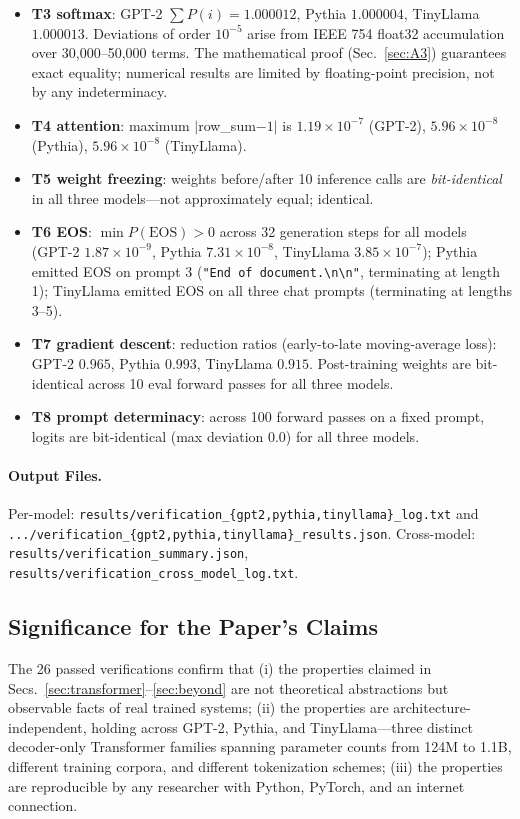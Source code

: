 \documentclass[a4paper,twocolumn,11pt]{article}
\begin{document}
\begin{itemize}[noitemsep]
\item \textbf{T3 softmax}: GPT-2 $\sum P(i) = 1.000012$, Pythia $1.000004$, TinyLlama $1.000013$. Deviations of order $10^{-5}$ arise from IEEE 754 float32 accumulation over 30{,}000--50{,}000 terms. The mathematical proof (Sec.~\ref{sec:A3}) guarantees exact equality; numerical results are limited by floating-point precision, not by any indeterminacy.
\item \textbf{T4 attention}: maximum $|$row\_sum$-1|$ is $1.19 \times 10^{-7}$ (GPT-2), $5.96 \times 10^{-8}$ (Pythia), $5.96 \times 10^{-8}$ (TinyLlama).
\item \textbf{T5 weight freezing}: weights before/after 10 inference calls are \emph{bit-identical} in all three models---not approximately equal; identical.
\item \textbf{T6 EOS}: $\min P(\mathrm{EOS}) > 0$ across 32 generation steps for all models (GPT-2 $1.87 \times 10^{-9}$, Pythia $7.31 \times 10^{-8}$, TinyLlama $3.85 \times 10^{-7}$); Pythia emitted EOS on prompt 3 (\texttt{"End of document.\textbackslash n\textbackslash n"}, terminating at length 1); TinyLlama emitted EOS on all three chat prompts (terminating at lengths 3--5).
\item \textbf{T7 gradient descent}: reduction ratios (early-to-late moving-average loss): GPT-2 $0.965$, Pythia $0.993$, TinyLlama $0.915$. Post-training weights are bit-identical across 10 eval forward passes for all three models.
\item \textbf{T8 prompt determinacy}: across 100 forward passes on a fixed prompt, logits are bit-identical (max deviation 0.0) for all three models.
\end{itemize}

\paragraph{Output Files.}  Per-model: \texttt{results/verification\_\{gpt2,pythia,tinyllama\}\_log.txt} and \texttt{.../verification\_\{gpt2,pythia,tinyllama\}\_results.json}. Cross-model: \texttt{results/verification\_summary.json}, \texttt{results/verification\_cross\_model\_log.txt}.

\subsection{Significance for the Paper's Claims}
\label{sec:B4}

The 26 passed verifications confirm that (i) the properties claimed in Secs.~\ref{sec:transformer}--\ref{sec:beyond} are not theoretical abstractions but observable facts of real trained systems; (ii) the properties are architecture-independent, holding across GPT-2, Pythia, and TinyLlama---three distinct decoder-only Transformer families spanning parameter counts from 124M to 1.1B, different training corpora, and different tokenization schemes; (iii) the properties are reproducible by any researcher with Python, PyTorch, and an internet connection.
\end{document}
